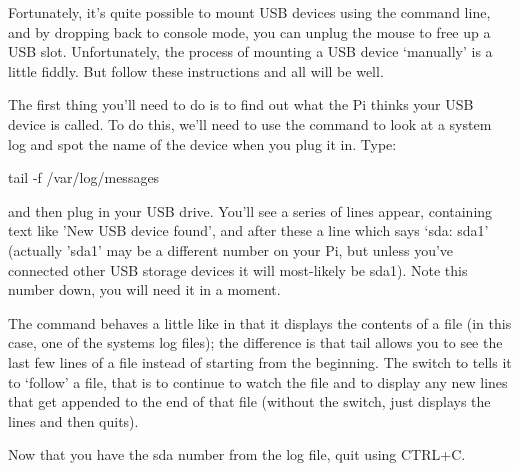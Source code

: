 Fortunately, it's quite possible to mount USB devices using the command line, and by dropping back to console mode, you can unplug the mouse to free up a USB slot. Unfortunately, the process of mounting a USB device `manually' is a little fiddly. But follow these instructions and all will be well.

The first thing you'll need to do is to find out what the Pi thinks your USB device is called. To do this, we'll need to use the  command to look at a system log and spot the name of the device when you plug it in. Type:

\begin{ttoutenv}
tail -f /var/log/messages
\end{ttoutenv}

and then plug in your USB drive. You'll see a series of lines appear, containing text like 'New USB device found', and after these a line which says `sda: sda1' (actually 'sda1' may be a different number on your Pi, but unless you've connected other USB storage devices it will most-likely be sda1). Note this number down, you will need it in a moment. 

The  command behaves a little like  in that it displays the contents of a file (in this case, one of the systems log files); the difference is that tail allows you to see the last few lines of a file instead of starting from the beginning. The  switch to  tells it to `follow' a file, that is to continue to watch the file and to display any new lines that get appended to the end of that file (without the switch,  just displays the lines and then quits). 

Now that you have the sda number from the log file, quit  using CTRL+C.


